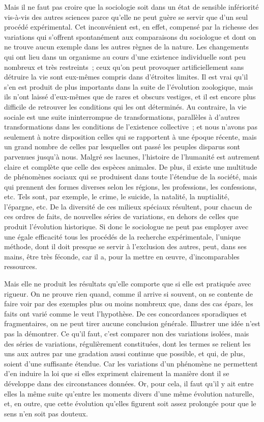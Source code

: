 \documentclass[french,twoside]{book} %
\begin{document}
Mais il ne faut pas croire que la sociologie soit dans un état de sensible infériorité vis-à-vis des autres sciences parce qu’elle ne peut guère se servir que d’un seul procédé expérimental. Cet inconvénient est, en effet, compensé par la richesse des variations qui s’offrent spontanément aux comparaisons du sociologue et dont on ne trouve aucun exemple dans les autres règnes de la nature. Les changements qui ont lieu dans un organisme au cours d’une existence individuelle sont peu nombreux et très restreints ; ceux qu’on peut provoquer artificiellement sans détruire la vie sont eux-mêmes compris dans d’étroites limites. Il est vrai qu’il s’en est produit de plus importants dans la suite de l’évolution zoologique, mais ils n’ont laissé d’eux-mêmes que de rares et obscurs vestiges, et il est encore plus difficile de retrouver les conditions qui les ont déterminés. Au contraire, la vie sociale est une suite ininterrompue de transformations, parallèles à d’autres transformations dans les conditions de l’existence collective ; et nous n’avons pas seulement à notre disposition celles qui se rapportent à une époque récente, mais un grand nombre de celles par lesquelles ont passé les peuples disparus sont parvenues jusqu’à nous. Malgré ses lacunes, l’histoire de l’humanité est autrement claire et complète que celle des espèces animales. De plus, il existe une multitude de phénomènes sociaux qui se produisent dans toute l’étendue de la société, mais qui prennent des formes diverses selon les régions, les professions, les confessions, etc. Tels sont, par exemple, le crime, le suicide, la natalité, la nuptialité, l’épargne, etc. De la diversité de ces milieux spéciaux résultent, pour chacun de ces ordres de faits, de nouvelles séries de variations, en dehors de celles que produit l’évolution historique. Si donc le sociologue ne peut pas employer avec une égale efficacité tous les procédés de la recherche expérimentale, l’unique méthode, dont il doit presque se servir à l’exclusion des autres, peut, dans ses mains, être très féconde, car il a, pour la mettre en œuvre, d’incomparables ressources.\par
Mais elle ne produit les résultats qu’elle comporte que si elle est pratiquée avec rigueur. On ne prouve rien quand, comme il arrive si souvent, on se contente de faire voir par des exemples plus ou moins nombreux que, dans des cas épars, les faits ont varié comme le veut l’hypothèse. De ces concordances sporadiques et fragmentaires, on ne peut tirer aucune conclusion générale. Illustrer une idée n’est pas la démontrer. Ce qu’il faut, c’est comparer non des variations isolées, mais des séries de variations, régulièrement constituées, dont les termes se relient les uns aux autres par une gradation aussi continue que possible, et qui, de plus, soient d’une suffisante étendue. Car les variations d’un phénomène ne permettent d’en induire la loi que si elles expriment clairement la manière dont il se développe dans des circonstances données. Or, pour cela, il faut qu’il y ait entre elles la même suite qu’entre les moments divers d’une même évolution naturelle, et, en outre, que cette évolution qu’elles figurent soit assez prolongée pour que le sens n’en soit pas douteux.
\end{document}
